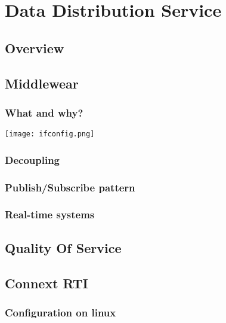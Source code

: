 \chapter{Data Distribution Service}
\section{Overview}


\section{Middlewear}
\subsection{What and why?}


\begin{center}
	\texttt{[image: ifconfig.png]}
\end{center}

\subsection{Decoupling}



\subsection{Publish/Subscribe pattern}


\subsection{Real-time systems}

\section{Quality Of Service}


\section{Connext RTI}

\subsection{Configuration on linux}